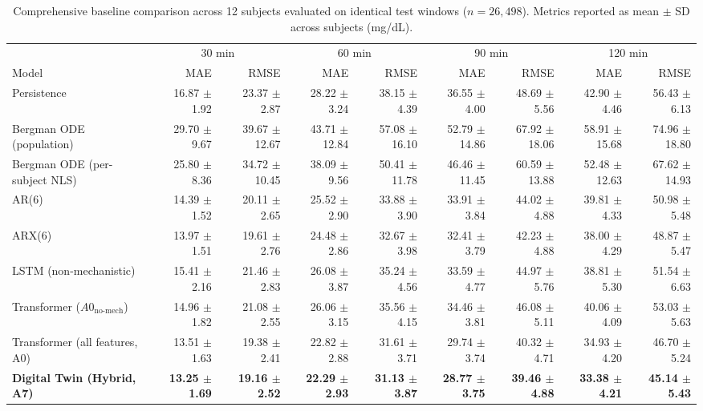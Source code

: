 \documentclass[journal]{IEEEtran}
\begin{document}
\begin{table}[t]
\centering
\caption{Comprehensive baseline comparison across 12 subjects evaluated on identical test windows ($n=26{,}498$). Metrics reported as mean $\pm$ SD across subjects (mg/dL).}
\label{tab:baselines_identical}
\footnotesize
\setlength{\tabcolsep}{4.2pt}
\begin{tabular}{lrrrrrrrr}
\toprule
& \multicolumn{2}{c}{30 min} & \multicolumn{2}{c}{60 min} & \multicolumn{2}{c}{90 min} & \multicolumn{2}{c}{120 min} \\
\cmidrule(lr){2-3} \cmidrule(lr){4-5} \cmidrule(lr){6-7} \cmidrule(lr){8-9}
Model & MAE & RMSE & MAE & RMSE & MAE & RMSE & MAE & RMSE \\
\midrule
Persistence & 16.87 $\pm$ 1.92 & 23.37 $\pm$ 2.87 & 28.22 $\pm$ 3.24 & 38.15 $\pm$ 4.39 & 36.55 $\pm$ 4.00 & 48.69 $\pm$ 5.56 & 42.90 $\pm$ 4.46 & 56.43 $\pm$ 6.13 \\
Bergman ODE (population) & 29.70 $\pm$ 9.67 & 39.67 $\pm$ 12.67 & 43.71 $\pm$ 12.84 & 57.08 $\pm$ 16.10 & 52.79 $\pm$ 14.86 & 67.92 $\pm$ 18.06 & 58.91 $\pm$ 15.68 & 74.96 $\pm$ 18.80 \\
Bergman ODE (per-subject NLS) & 25.80 $\pm$ 8.36 & 34.72 $\pm$ 10.45 & 38.09 $\pm$ 9.56 & 50.41 $\pm$ 11.78 & 46.46 $\pm$ 11.45 & 60.59 $\pm$ 13.88 & 52.48 $\pm$ 12.63 & 67.62 $\pm$ 14.93 \\
AR(6) & 14.39 $\pm$ 1.52 & 20.11 $\pm$ 2.65 & 25.52 $\pm$ 2.90 & 33.88 $\pm$ 3.90 & 33.91 $\pm$ 3.84 & 44.02 $\pm$ 4.88 & 39.81 $\pm$ 4.33 & 50.98 $\pm$ 5.48 \\
ARX(6) & 13.97 $\pm$ 1.51 & 19.61 $\pm$ 2.76 & 24.48 $\pm$ 2.86 & 32.67 $\pm$ 3.98 & 32.41 $\pm$ 3.79 & 42.23 $\pm$ 4.88 & 38.00 $\pm$ 4.29 & 48.87 $\pm$ 5.47 \\
LSTM (non-mechanistic) & 15.41 $\pm$ 2.16 & 21.46 $\pm$ 2.83 & 26.08 $\pm$ 3.87 & 35.24 $\pm$ 4.56 & 33.59 $\pm$ 4.77 & 44.97 $\pm$ 5.76 & 38.81 $\pm$ 5.30 & 51.54 $\pm$ 6.63 \\
Transformer ($A0_{\text{no-mech}}$) & 14.96 $\pm$ 1.82 & 21.08 $\pm$ 2.55 & 26.06 $\pm$ 3.15 & 35.56 $\pm$ 4.15 & 34.46 $\pm$ 3.81 & 46.08 $\pm$ 5.11 & 40.06 $\pm$ 4.09 & 53.03 $\pm$ 5.63 \\
Transformer (all features, A0) & 13.51 $\pm$ 1.63 & 19.38 $\pm$ 2.41 & 22.82 $\pm$ 2.88 & 31.61 $\pm$ 3.71 & 29.74 $\pm$ 3.74 & 40.32 $\pm$ 4.71 & 34.93 $\pm$ 4.20 & 46.70 $\pm$ 5.24 \\
\textbf{Digital Twin (Hybrid, A7)} & \textbf{13.25 $\pm$ 1.69} & \textbf{19.16 $\pm$ 2.52} & \textbf{22.29 $\pm$ 2.93} & \textbf{31.13 $\pm$ 3.87} & \textbf{28.77 $\pm$ 3.75} & \textbf{39.46 $\pm$ 4.88} & \textbf{33.38 $\pm$ 4.21} & \textbf{45.14 $\pm$ 5.43} \\
\bottomrule
\end{tabular}
\end{table}
\end{document}
